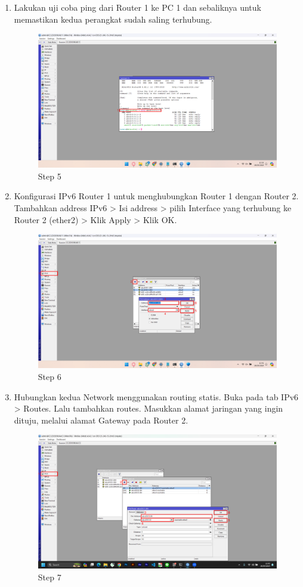\begin{center}
\begin{enumerate}
        \item Lakukan uji coba ping dari Router 1 ke PC 1 dan sebaliknya untuk memastikan kedua perangkat sudah saling terhubung.
        \begin{figure}[H]
			\centering
			\includegraphics[width=0.8\linewidth]{P5/img/pc1/Step 5.png}
			\caption{Step 5}
			\label{fig:Step 5(PC 1)}
		\end{figure}

        \item Konfigurasi IPv6 Router 1 untuk menghubungkan Router 1 dengan Router 2. Tambahkan address IPv6 > Isi address > pilih Interface yang terhubung ke Router 2 (ether2) > Klik Apply > Klik OK.
        \begin{figure}[H]
			\centering
			\includegraphics[width=0.8\linewidth]{P5/img/pc1/Step 6.png}
			\caption{Step 6}
			\label{fig:Step 6(PC 1)}
		\end{figure}

        \item Hubungkan kedua Network menggunakan routing statis. Buka pada tab IPv6 > Routes. Lalu tambahkan routes. Masukkan alamat jaringan yang ingin dituju, melalui alamat Gateway pada Router 2.
        \begin{figure}[H]
			\centering
			\includegraphics[width=0.8\linewidth]{P5/img/pc1/Step 7.png}
			\caption{Step 7}
			\label{fig:Step 7(PC 1)}
		\end{figure}
    \end{enumerate}


\end{center}
